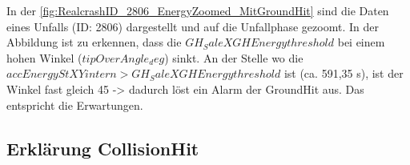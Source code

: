 In der \autoref{fig:RealcrashID_2806_EnergyZoomed_MitGroundHit} sind die Daten eines Unfalls (ID: 2806) dargestellt und auf die Unfallphase gezoomt. In der Abbildung ist zu erkennen, dass die $GH_SaleXGHEnergythreshold$ bei einem hohen Winkel ($tipOverAngle_deg$) sinkt. An der Stelle wo die $accEnergyStXYintern > GH_SaleXGHEnergythreshold$ ist (ca. 591,35 s), ist der Winkel fast gleich 45 -> dadurch löst ein Alarm der GroundHit aus. Das entspricht die Erwartungen.




\subsection{Erklärung CollisionHit}

